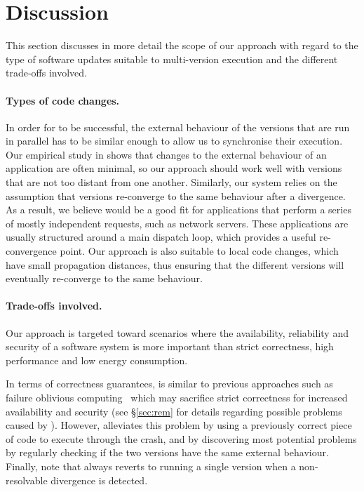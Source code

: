 \section{Discussion}
\label{safe-updates:discussion}

This section discusses in more detail the scope of our approach with
regard to the type of software updates suitable to multi-version
execution and the different trade-offs involved.


\paragraph{Types of code changes.} In order for \mx to be successful, the
external behaviour of the versions that are run in parallel has to be similar
enough to allow us to synchronise their execution.  Our empirical study in
 shows that changes to the external behaviour of
an application are often minimal, so our approach should work well with
versions that are not too distant from one another.  Similarly, our system
relies on the assumption that versions re-converge to the same behaviour after
a divergence.  As a result, we believe \mx would be a good fit for applications
that perform a series of mostly independent requests, such as network servers.
These applications are usually structured around a main dispatch loop, which
provides a useful re-convergence point.  Our approach is also suitable to local
code changes, which have small propagation distances, thus ensuring that the
different versions will eventually re-converge to the same behaviour.

\paragraph{Trade-offs involved.} Our approach is targeted toward scenarios
where the availability, reliability and security of a software system is more
important than strict correctness, high performance and low energy consumption.  

In terms of correctness guarantees, \mx is similar to previous approaches such
as failure oblivious computing~\cite{fo} which may sacrifice strict correctness
for increased availability and security (see \S\ref{sec:rem} for details
regarding possible problems caused by \mx).  However, \mx alleviates this
problem by using a previously correct piece of code to execute through the
crash, and by discovering most potential problems by regularly checking if the
two versions have the same external behaviour.  Finally, note that \mx always
reverts to running a single version when a non-resolvable divergence is
detected.

